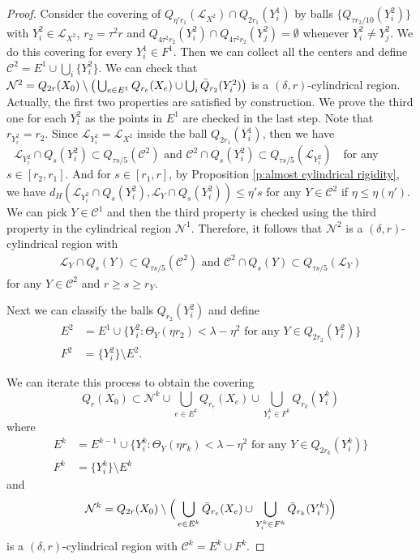 \documentclass[10pt,a4paper]{amsart}
\newcommand{\cC}{\mathcal{C}}
\newcommand{\cL}{\mathcal{L}}
\newcommand{\cN}{\mathcal{N}}
\begin{document}
\begin{proof}
    
    Consider the covering of $Q_{\eta' r_1}(\cL_{X^2}) \cap Q_{2r_1}(Y^1_i)$ by balls $\{Q_{\tau r_2/10}(Y^2_i)\}$ with $Y^2_i \in \cL_{X^2}$, $r_2 = \tau^2 r$ and $Q_{4\tau^2 r_2}(Y^2_i) \cap Q_{4\tau^2 r_2}(Y^2_j) =\emptyset$ whenever $Y_i^2 \neq Y^2_j$. We do this covering for every $Y^1_i \in F^1$. Then we can collect all the centers and define $\cC^2 = E^1 \cup \bigcup_i \{Y^2_i\}$. We can check that $\cN^2 = Q_{2r}(X_0) \setminus \big(\bigcup_{e \in E^1}Q_{r_e}(X_e) \cup \bigcup_i \Bar{Q}_{r_2}(Y^2_i) \big)$ is a $(\delta,r)$-cylindrical region. Actually, the first two properties are satisfied by construction. We prove the third one for each $Y^2_i$ as the points in $E^1$ are checked in the last step. Note that $r_{Y^2_i} = r_2$. Since $\cL_{Y^2_i} = \cL_{X^2}$ inside the ball $Q_{2r_1}(Y^1_i)$, then we have 
$\text{ $\cL_{Y^2_i}\cap Q_s(Y^2_i) \subset Q_{\tau s/5}(\cC^2)$ and $\cC^2 \cap Q_s(Y^2_i) \subset Q_{\tau s/5}(\cL_{Y^2_i})$ }$
    for any $s\in [r_2,r_1]$. And for $s\in[r_1,r]$, by Proposition \ref{p:almost cylindrical rigidity}, we have $d_H(\cL_{Y_i^2}\cap Q_{s}(Y^2_i), \cL_{Y}\cap Q_s(Y^2_i)) \le \eta' s$ for any $Y \in \cC^2$ if $\eta\le \eta(\eta')$. We can pick $Y \in \cC^1$ and then the third property is checked using the third property in the cylindrical region $\cN^1$. Therefore, it follows that $\cN^2$ is a $(\delta, r)$-cylindrical region with 
\begin{align}\label{e:bettercovering5.8}
    \text{ $\cL_{Y}\cap Q_s(Y) \subset Q_{\tau s/5}(\cC^2)$ and $\cC^2 \cap Q_s(Y) \subset Q_{\tau s/5}(\cL_{Y})$ }
    \end{align}
    for any $Y\in \cC^2$ and $r\ge s\ge r_Y$. 

    Next we can classify the balls $Q_{r_2}(Y^2_i)$ and define
    \begin{equation*}
    \begin{split}
        E^2 &= E^1 \cup \{Y^2_i : \Theta_Y(\eta r_2) < \lambda - \eta^2 \text{ for any } Y \in Q_{2r_2}(Y^2_i) \} \\
        F^2 &= \{Y^2_i\} \setminus E^2.
    \end{split}
    \end{equation*}
    
We can iterate this process to obtain the covering
\begin{equation*}
    Q_r(X_0) \subset \cN^k \cup \bigcup_{e \in E^k} Q_{r_e}(X_e) \cup \bigcup_{Y^k_i \in F^k} Q_{r_k}(Y^k_i)
\end{equation*}
where 
\begin{equation*}
\begin{split}
    E^k &= E^{k-1} \cup \{Y^k_i: \Theta_Y(\eta r_k) < \lambda -\eta^2 \text{ for any } Y\in Q_{2r_k}(Y^k_i) \} \\
    F^k &= \{Y^k_i\} \setminus E^k
\end{split}
\end{equation*}
and $$\cN^k = Q_{2r}(X_0) \setminus \Big( \bigcup_{e\in E^k} \Bar{Q}_{r_e}(X_e) \cup \bigcup_{Y^k_i \in F^k} \Bar{Q}_{r_k}(Y^k_i) \Big)$$
is a $(\delta,r)$-cylindrical region with $\cC^k = E^k \cup F^k$. 


\end{proof}
\end{document}
